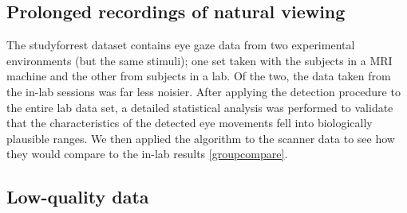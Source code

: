 

\subsection*{Prolonged recordings of natural viewing}\label{ana_2}

The studyforrest dataset contains eye gaze data from two experimental environments (but the same stimuli); one set taken with the subjects in a MRI machine and the other from subjects in a lab. Of the two, the data taken from the in-lab sessions was far less noisier. After applying the detection procedure to the entire lab data set, a detailed statistical analysis was performed to validate that the characteristics of the detected eye movements fell into biologically plausible ranges. We then applied the algorithm to the scanner data to see how they would compare to the in-lab results \ref{groupcompare}. 

\subsection*{Low-quality data}\label{ana_3}

